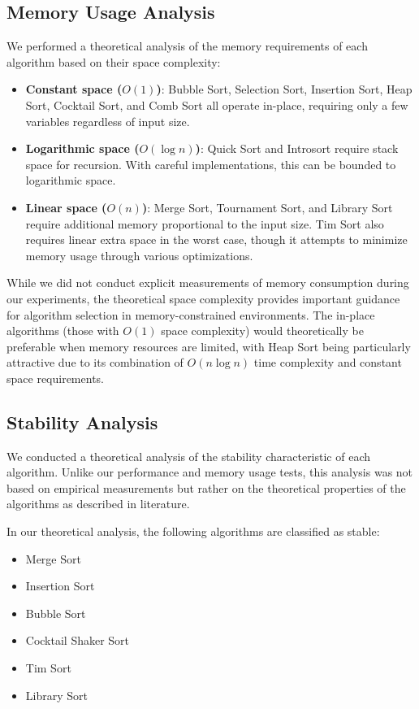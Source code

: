 \documentclass[sigconf]{acmart}
\begin{document}
\subsection{Memory Usage Analysis}
We performed a theoretical analysis of the memory requirements of each algorithm based on their space complexity:

\begin{itemize}
  \item \textbf{Constant space ($O(1)$)}: Bubble Sort, Selection Sort, Insertion Sort, Heap Sort, Cocktail Sort, and Comb Sort all operate in-place, requiring only a few variables regardless of input size.
  
  \item \textbf{Logarithmic space ($O(\log n)$)}: Quick Sort and Introsort require stack space for recursion. With careful implementations, this can be bounded to logarithmic space.
  
  \item \textbf{Linear space ($O(n)$)}: Merge Sort, Tournament Sort, and Library Sort require additional memory proportional to the input size. Tim Sort also requires linear extra space in the worst case, though it attempts to minimize memory usage through various optimizations.
\end{itemize}

While we did not conduct explicit measurements of memory consumption during our experiments, the theoretical space complexity provides important guidance for algorithm selection in memory-constrained environments. The in-place algorithms (those with $O(1)$ space complexity) would theoretically be preferable when memory resources are limited, with Heap Sort being particularly attractive due to its combination of $O(n \log n)$ time complexity and constant space requirements.

\subsection{Stability Analysis}
We conducted a theoretical analysis of the stability characteristic of each algorithm. Unlike our performance and memory usage tests, this analysis was not based on empirical measurements but rather on the theoretical properties of the algorithms as described in literature.

In our theoretical analysis, the following algorithms are classified as stable:
\begin{itemize}
    \item Merge Sort
    \item Insertion Sort
    \item Bubble Sort
    \item Cocktail Shaker Sort
    \item Tim Sort
    \item Library Sort
\end{itemize}
\end{document}
